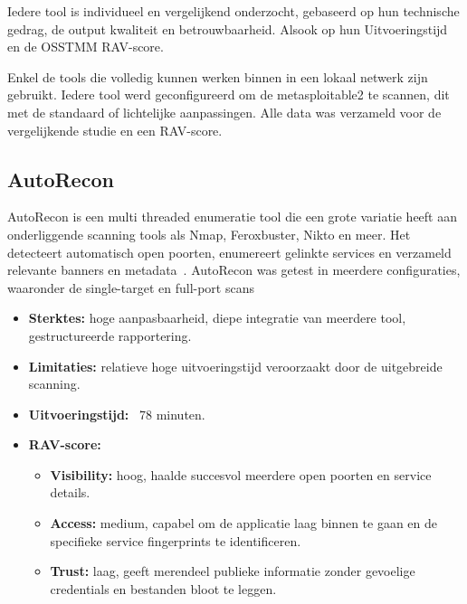 Iedere tool is individueel en vergelijkend onderzocht, gebaseerd op hun technische gedrag, de output kwaliteit en betrouwbaarheid. Alsook op hun Uitvoeringstijd en de OSSTMM RAV-score.

Enkel de tools die volledig kunnen werken binnen in een lokaal netwerk zijn gebruikt.
Iedere tool werd geconfigureerd om de metasploitable2 te scannen, dit met de standaard of lichtelijke aanpassingen.
Alle data was verzameld voor de vergelijkende studie en een RAV-score.

\subsection{AutoRecon}
AutoRecon is een multi threaded enumeratie tool die een grote variatie heeft aan onderliggende scanning tools als Nmap, Feroxbuster, Nikto en meer.
Het detecteert automatisch open poorten, enumereert gelinkte services en verzameld relevante banners en metadata~\autocite{AutoRecon}. 
AutoRecon was getest in meerdere configuraties, waaronder de single-target en full-port scans 


\begin{itemize}
  \item \textbf{Sterktes:} hoge aanpasbaarheid, diepe integratie van meerdere tool, gestructureerde rapportering.
  \item \textbf{Limitaties:} relatieve hoge uitvoeringstijd veroorzaakt door de uitgebreide scanning.
  \item \textbf{Uitvoeringstijd:} ~78 minuten.
  \item \textbf{RAV-score:}
    {\small
    \begin{itemize}
      \item \textbf{Visibility:} hoog, haalde succesvol meerdere open poorten en service details. 
      \item \textbf{Access:} medium, capabel om de applicatie laag binnen te gaan en de specifieke service fingerprints te identificeren. 
      \item \textbf{Trust:} laag, geeft merendeel publieke informatie zonder gevoelige credentials en bestanden bloot te leggen. 
    \end{itemize}
    } 
\end{itemize}
\newpage


